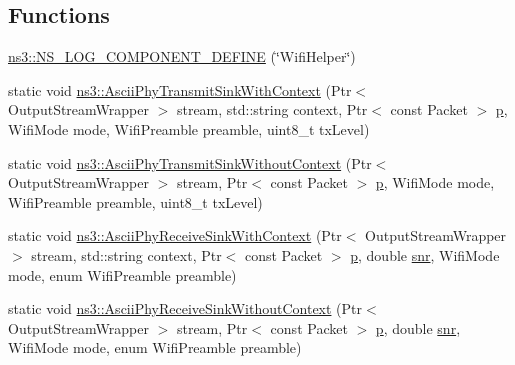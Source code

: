 \subsection*{Functions}
\begin{DoxyCompactItemize}
\item 
\hyperlink{namespacens3_a93b42502fd4d3a1d452f8c72022e7323}{ns3\+::\+N\+S\+\_\+\+L\+O\+G\+\_\+\+C\+O\+M\+P\+O\+N\+E\+N\+T\+\_\+\+D\+E\+F\+I\+NE} (\char`\"{}Wifi\+Helper\char`\"{})
\item 
static void \hyperlink{namespacens3_ae217606eb9244d9c833b9dddbe1a964a}{ns3\+::\+Ascii\+Phy\+Transmit\+Sink\+With\+Context} (Ptr$<$ Output\+Stream\+Wrapper $>$ stream, std\+::string context, Ptr$<$ const Packet $>$ \hyperlink{lte__link__budget__x2__handover__measures_8m_ac9de518908a968428863f829398a4e62}{p}, Wifi\+Mode mode, Wifi\+Preamble preamble, uint8\+\_\+t tx\+Level)
\item 
static void \hyperlink{namespacens3_af1e94937b00eeb80a08c06ca300bfea5}{ns3\+::\+Ascii\+Phy\+Transmit\+Sink\+Without\+Context} (Ptr$<$ Output\+Stream\+Wrapper $>$ stream, Ptr$<$ const Packet $>$ \hyperlink{lte__link__budget__x2__handover__measures_8m_ac9de518908a968428863f829398a4e62}{p}, Wifi\+Mode mode, Wifi\+Preamble preamble, uint8\+\_\+t tx\+Level)
\item 
static void \hyperlink{namespacens3_a040ca8ac0d1c0a56f4e431307cb3058c}{ns3\+::\+Ascii\+Phy\+Receive\+Sink\+With\+Context} (Ptr$<$ Output\+Stream\+Wrapper $>$ stream, std\+::string context, Ptr$<$ const Packet $>$ \hyperlink{lte__link__budget__x2__handover__measures_8m_ac9de518908a968428863f829398a4e62}{p}, double \hyperlink{lte__pathloss_8m_ae6e82a215dff6b79fb6e9952a1b78453}{snr}, Wifi\+Mode mode, enum Wifi\+Preamble preamble)
\item 
static void \hyperlink{namespacens3_a7ca07e06f80459c9c62e3b4e9eb6ff40}{ns3\+::\+Ascii\+Phy\+Receive\+Sink\+Without\+Context} (Ptr$<$ Output\+Stream\+Wrapper $>$ stream, Ptr$<$ const Packet $>$ \hyperlink{lte__link__budget__x2__handover__measures_8m_ac9de518908a968428863f829398a4e62}{p}, double \hyperlink{lte__pathloss_8m_ae6e82a215dff6b79fb6e9952a1b78453}{snr}, Wifi\+Mode mode, enum Wifi\+Preamble preamble)
\end{DoxyCompactItemize}

